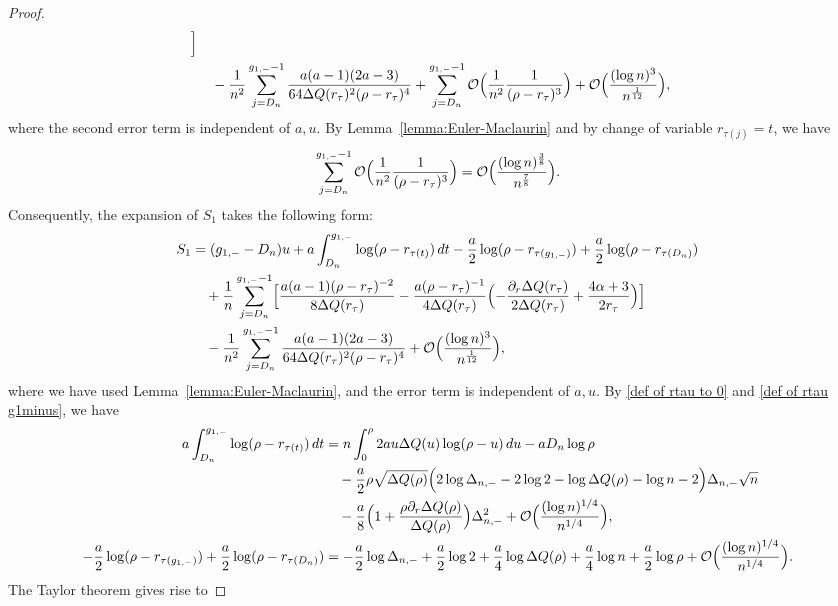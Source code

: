 \documentclass[reqno]{amsart}
\newcommand{\1}{\mathds{1}}
\numberwithin{equation}{section}
\theoremstyle{definition}
\begin{document}
\begin{proof}
\begin{align*}
\Bigr]
\\
&\quad
-\frac{1}{n^2}
\sum_{j=D_n}^{g_{1,-}-1}
\frac{a(a-1)(2a-3)}{64\Delta Q(r_{\tau})^2(\rho-r_{\tau})^4}
+\sum_{j=D_n}^{g_{1,-}-1}
\mathcal{O}\Bigl(\frac{1}{n^{2}}\frac{1}{(\rho-r_{\tau})^3}\Bigr)
+
\mathcal{O}\Bigl(\frac{(\log n)^{3}}{n^{\frac{1}{12}}}\Bigr),
\end{align*}
where the second error term is independent of $a,u$.
By Lemma~\ref{lemma:Euler-Maclaurin} and by change of variable $r_{\tau(j)}=t$, we have 
\[
\sum_{j=D_n}^{g_{1,-}-1}
\mathcal{O}\Bigl(\frac{1}{n^{2}}\frac{1}{(\rho-r_{\tau})^3}\Bigr)
=
\mathcal{O}\Bigl(\frac{(\log n)^{\frac{3}{8}}}{n^{\frac{7}{8}}}\Bigr). 
\]
Consequently, the expansion of $S_1$ takes the following form:
\begin{align*}
S_1&=(g_{1,-}-D_n)u+a\int_{D_n}^{g_{1,-}}\log(\rho-r_{\tau(t)})\,dt
-\frac{a}{2}\log(\rho-r_{\tau(g_{1,-})})
+\frac{a}{2}\log(\rho-r_{\tau(D_n)})
\\
&\quad
+\frac{1}{n}\sum_{j=D_n}^{g_{1,-}-1}
\Bigl[
\frac{a(a-1)(\rho-r_{\tau})^{-2}}{8\Delta Q(r_{\tau})}
-\frac{a(\rho-r_{\tau})^{-1}}{4\Delta Q(r_{\tau})}
\Bigl( 
-\frac{\partial_r\Delta Q(r_{\tau})}{2\Delta Q(r_{\tau})}+\frac{4\alpha+3}{2r_{\tau}}
\Bigr)
\Bigr]
\\
&\quad
-\frac{1}{n^2}
\sum_{j=D_n}^{g_{1,-}-1}
\frac{a(a-1)(2a-3)}{64\Delta Q(r_{\tau})^2(\rho-r_{\tau})^4}
+\mathcal{O}\Bigl(\frac{(\log n)^{3}}{n^{\frac{1}{12}}}\Bigr), 
\end{align*}
where we have used Lemma~\ref{lemma:Euler-Maclaurin}, and the error term is independent of $a,u$.
By \eqref{def of rtau to 0} and \eqref{def of rtau g1minus}, we have 
\begin{align*}
a\int_{D_n}^{g_{1,-}}\log(\rho-r_{\tau(t)})\,dt
&=
n\int_{0}^{\rho}2a u\Delta Q(u)\log(\rho-u)\,du
-aD_{n}\log\rho
\\
&\quad
-\frac{a}{2}\rho\sqrt{\Delta Q(\rho)}
\Bigl(2\log\Delta_{n,-}-2\log 2 -\log\Delta Q(\rho)-\log n-2\Bigr)\Delta_{n,-}\sqrt{n}
\\
&\quad
-\frac{a}{8}\Bigl(1+\frac{\rho\partial_r\Delta Q(\rho)}{\Delta Q(\rho)}\Bigr)\Delta_{n,-}^2
+\mathcal{O}\Bigl(\frac{(\log n)^{1/4}}{n^{1/4}}\Bigr),
\\
-\frac{a}{2}\log(\rho-r_{\tau(g_{1,-})})+\frac{a}{2}\log(\rho-r_{\tau(D_n)})
&=
-\frac{a}{2}\log\Delta_{n,-}
+\frac{a}{2}\log 2
+\frac{a}{4}\log\Delta Q(\rho)
+\frac{a}{4}\log n
+\frac{a}{2}\log\rho
+\mathcal{O}\Bigl(\frac{(\log n)^{1/4}}{n^{1/4}}\Bigr). 
\end{align*}
The Taylor theorem gives rise to

\end{proof}
\end{document}
